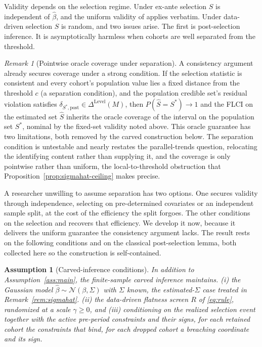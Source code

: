 \documentclass[12pt]{article}
\newtheorem{assumption}{Assumption}
\theoremstyle{remark}
\newtheorem{remark}{Remark}
\begin{document}
Validity depends on the selection regime. Under ex-ante selection $S$ is independent of $\hat\beta$, and the
uniform validity of \citet{rambachan2023} applies verbatim. Under data-driven selection $S$ is random, and
two issues arise. The first is post-selection inference. It is asymptotically harmless when cohorts are well
separated from the threshold.

\begin{remark}[Pointwise oracle coverage under separation]\label{rem:oracle}
A consistency argument already secures coverage under a strong condition. If the selection statistic is
consistent and every cohort's population value lies a fixed distance from the threshold $c$ (a separation
condition), and the population credible set's residual violation satisfies
$\delta_{S^\ast,\mathrm{post}}\in\Delta^{\mathrm{Level}}(M)$, then $P(\hat S=S^\ast)\to1$ and the FLCI on the
estimated set $\hat S$ inherits the oracle coverage of the interval on the population set $S^\ast$, nominal
by the fixed-set validity noted above. This oracle guarantee has two limitations, both removed by the carved construction
below. The separation condition is untestable
and nearly restates the parallel-trends question, relocating the identifying content rather than supplying
it, and the coverage is only pointwise rather than uniform, the local-to-threshold obstruction that
Proposition~\ref{prop:sigmahat-ceiling} makes precise.
\end{remark}

A researcher unwilling to assume separation has two options. One secures validity through independence,
selecting on pre-determined covariates or an independent sample split, at the cost of the efficiency the
split forgoes. The other conditions on the selection and recovers that efficiency. We develop it now,
because it delivers the uniform guarantee the consistency argument lacks. The result rests on the following
conditions and on the classical post-selection lemma, both collected here so the construction is
self-contained.

\begin{assumption}[Carved-inference conditions]\label{ass:carve}
In addition to Assumption~\ref{ass:main}, the finite-sample carved inference maintains. (i) the Gaussian
model $\hat\beta\sim\mathcal N(\beta,\Sigma)$ with $\Sigma$ known, the estimated-$\Sigma$ case treated in
Remark~\ref{rem:sigmahat}. (ii) the data-driven flatness screen $R$ of \eqref{eq:rule}, randomized at a
scale $\gamma\ge0$, and (iii) conditioning on the realized selection event together with the active
pre-period constraints and their signs, for each retained cohort the constraints that bind, for each
dropped cohort a breaching coordinate and its sign.
\end{assumption}
\end{document}
